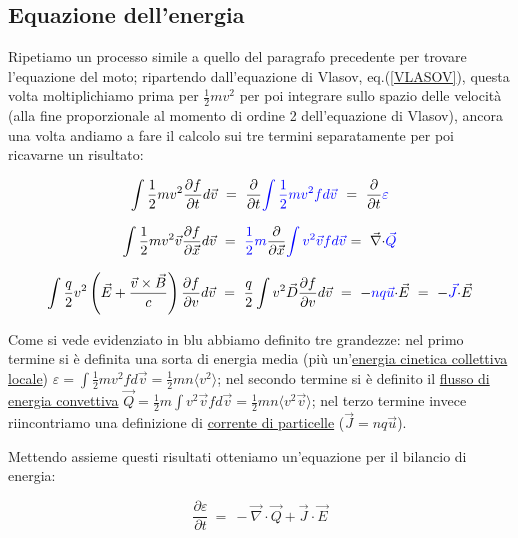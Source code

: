 \subsection{Equazione dell'energia}
Ripetiamo un processo simile a quello del paragrafo precedente per trovare l'equazione del moto; ripartendo dall'equazione di Vlasov, eq.(\ref{VLASOV}), questa volta moltiplichiamo prima per $\frac{1}{2}mv^2$ per poi integrare sullo spazio delle velocità (alla fine proporzionale al momento di ordine 2 dell'equazione di Vlasov), ancora una volta andiamo a fare il calcolo sui tre termini separatamente per poi ricavarne un risultato:

\[ \int \frac{1}{2} m v^2 \frac{\partial f}{\partial t} d\vec v\ =\ \frac{\partial}{\partial t} \color{blue}{\int \frac{1}{2} m v^2 f d\vec v} \ \color{black}{\ =\ \frac{\partial}{\partial t}}\color{blue}{\varepsilon} \]

\[ \int \frac{1}{2} m v^2 \vec v \frac{\partial f}{\partial \vec x} d\vec v\ =\ \color{blue}{\frac{1}{2}m} \color{black}{\frac{\partial}{\partial\vec x}} \color{blue}{\int v^2 \vec v f d\vec v} \color{black}{\ =\ \vec \nabla\cdot} \color{blue}{\vec Q}\]

\[ \int \frac{q}{2} v^2 \left( \vec E + \frac{\vec v \times \vec B}{c}\right) \frac{\partial f}{\partial v} d\vec v\ =\ \frac{q}{2} \int v^2 \vec D \frac{\partial f}{\partial v} d\vec v\ =\ - \color{blue}{nq\vec u} \color{black}{\cdot \vec E \ =\ -} \color{blue}{\vec J} \color{black}{\cdot \vec E} \]

Come si vede evidenziato in blu abbiamo definito tre grandezze: nel primo termine si è definita una sorta di energia media (più un'\underline{energia cinetica collettiva locale}) $\boxed{\varepsilon = \displaystyle\int \frac{1}{2} m v^2 f d\vec v=\frac{1}{2}mn\langle v^2\rangle}$; nel secondo termine si è definito il \underline{flusso di energia convettiva} $\boxed{\vec Q= \frac{1}{2}m\int v^2 \vec v f d\vec v = \frac{1}{2}mn\langle v^2 \vec v\rangle}$; nel terzo termine invece riincontriamo una definizione di \underline{corrente di particelle} ($\vec J=nq\vec u$).

\vspace{0.5cm}
Mettendo assieme questi risultati otteniamo un'equazione per il bilancio di energia:


\begin{equation}
	\boxed{\ \frac{\partial \varepsilon}{\partial t}\ =\ -\vec \nabla\cdot \vec Q +\vec J \cdot \vec E\ }
\end{equation}

